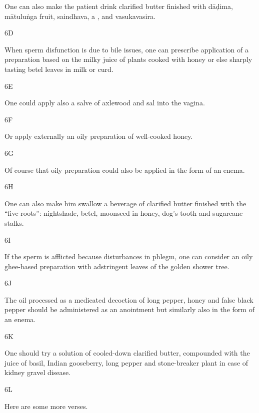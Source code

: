 \begin{translation}
  One can also make the patient drink clarified butter finished with \gls{dāḍima}, 
  \gls{mātuluṅga} fruit, \gls{saindhava}, a , and 
  \gls{vasukavasira}.
 
 
 \item[6D]
 
   When sperm disfunction is due to bile issues, one can prescribe application of 
   a preparation based on the milky juice of plants cooked with honey or else 
   sharply tasting betel leaves in milk or curd.
 
 \item[6E]
 
  One could apply also a salve of axlewood and sal into the vagina.
 
 \item[6F]
 
  Or apply externally an oily preparation of well-cooked honey.
 
 \item[6G]
 
  Of course that oily preparation could also be applied in the form of an enema.
 
 \item[6H]
 
  One can also make him swallow a beverage of clarified butter finished with the 
  “five roots”: nightshade, betel, moonseed in honey, dog’s tooth and sugarcane 
  stalks. 
 
 \item[6I]
 
  If the sperm is afflicted because disturbances in phlegm, one can consider an 
  oily ghee-based preparation with adstringent leaves of the golden shower tree.
 
 \item[6J]
 
  The oil processed as a medicated decoction of long pepper, honey and false 
  black pepper should be administered as an anointment but similarly also in the 
  form of an enema. 
 
 \item[6K]
 
  One should try a solution of cooled-down clarified butter, compounded with the 
  juice of basil, Indian gooseberry, long pepper and stone-breaker plant in case of 
  kidney gravel disease.
 
 \item[6L]
 
  Here are some more verses.
 

\end{translation}

